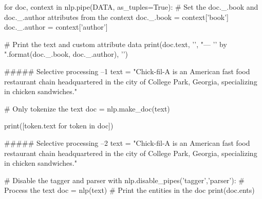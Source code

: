 for doc, context in nlp.pipe(DATA, as_tuples=True):
    # Set the doc._.book and doc._.author attributes from the context
    doc._.book = context['book']
    doc._.author = context['author']
    
    # Print the text and custom attribute data
    print(doc.text, '\n', "— '{}' by {}".format(doc._.book, doc._.author), '\n')
    
##### Selective processing  --1
text = "Chick-fil-A is an American fast food restaurant chain headquartered in the city of College Park, Georgia, specializing in chicken sandwiches."

# Only tokenize the text
doc = nlp.make_doc(text)

print([token.text for token in doc])
    
##### Selective processing  --2    
text = "Chick-fil-A is an American fast food restaurant chain headquartered in the city of College Park, Georgia, specializing in chicken sandwiches."

# Disable the tagger and parser
with nlp.disable_pipes('tagger','parser'):
    # Process the text
    doc = nlp(text)
    # Print the entities in the doc
    print(doc.ents)
